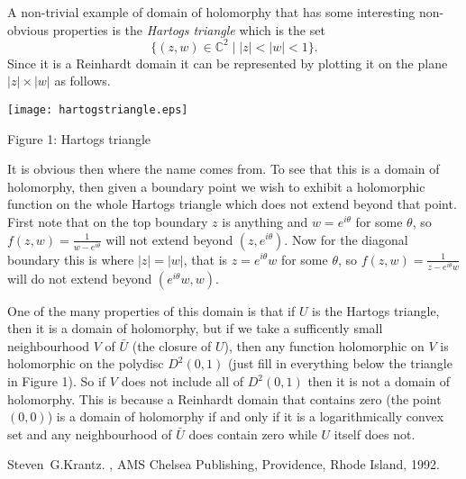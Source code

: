 \documentclass[12pt]{article}
\begin{document}
A non-trivial example of domain of holomorphy that has some
interesting 
non-obvious properties is the {\em Hartogs triangle} which is the set
\begin{equation*}
\{ (z,w) \in {\mathbb{C}}^2 \mid \lvert z \rvert < \lvert w \rvert < 1 \} .
\end{equation*}
Since it is a Reinhardt domain it can be represented
by plotting it on the plane $\lvert z \rvert \times \lvert w \rvert$
as follows.

\begin{center}
\texttt{[image: hartogstriangle.eps]}
\vspace*{0.1in}

{\tiny Figure 1: Hartogs triangle}
\end{center}

It is obvious then where the name comes from.  To see that this is a domain of holomorphy, then given a boundary point we wish to exhibit a holomorphic function on the whole Hartogs triangle which does not extend beyond that point.  First note that on the top boundary $z$ is anything and $w = e^{i\theta}$ for some $\theta$, so
$f(z,w) = \frac{1}{w-e^{i\theta}}$ will not extend beyond $(z,e^{i\theta})$.
Now for the diagonal boundary this is where $\lvert z \rvert = \lvert w \rvert$,
that is $z = e^{i\theta} w$ for some $\theta$, so 
$f(z,w) = \frac{1}{z-e^{i\theta}w}$ will do not extend beyond $(e^{i\theta}w,w)$.

One of the many properties of this domain is that if $U$ is the Hartogs
triangle, then it is a domain of holomorphy, but if we take a sufficently
small neighbourhood $V$ of $\bar{U}$ (the closure of $U$),
then any function holomorphic on $V$ is holomorphic on the polydisc
$D^2(0,1)$ (just fill in everything below the triangle in Figure 1).  So if $V$ does not include all of $D^2(0,1)$ then it is not a domain of
holomorphy.  This is because a Reinhardt domain that contains zero (the point
$(0,0)$) is a domain
of holomorphy if and only if it is a logarithmically convex set and any neighbourhood of $\bar{U}$ does contain zero while $U$ itself does not.

\begin{thebibliography}{9}
Steven~G.\@ Krantz.
{\em {}},
AMS Chelsea Publishing, Providence, Rhode Island, 1992.
\end{thebibliography}
\end{document}
